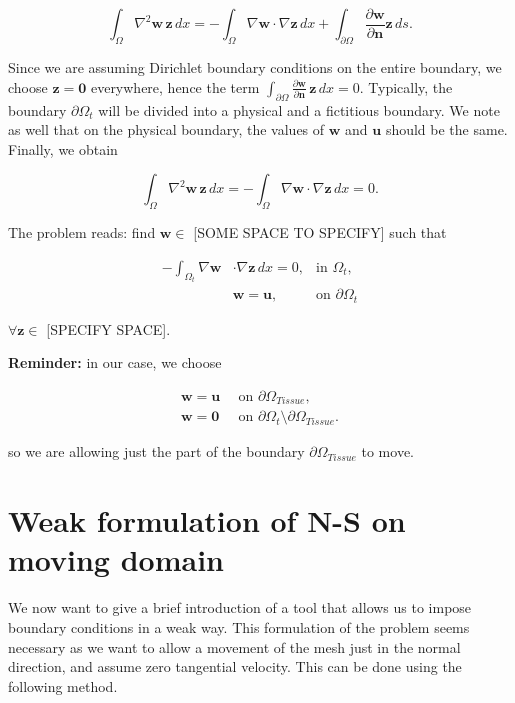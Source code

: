 \documentclass[11pt,a4paper,titlepage]{report}
\begin{document}
\[
\int_{\Omega} \nabla^2 \mathbf{w} \, \mathbf{z} \, dx = - \int_{\Omega} \nabla \mathbf{w} \cdot \nabla \mathbf{z} \, dx + \int_{\partial \Omega} \frac{\partial \mathbf{w}}{\partial \mathbf{n}} \mathbf{z} \, ds.
\]

Since we are assuming Dirichlet boundary conditions on the entire boundary, we choose $\mathbf{z = 0}$ everywhere, hence the term $\int_{\partial \Omega} \frac{\partial \mathbf{w}}{\partial \mathbf{n}} \, \mathbf{z} \, dx  = 0 $. Typically, the boundary $\partial \Omega_t$ will be divided into a physical and a fictitious boundary. We note as well that on the physical boundary, the values of $\mathbf{w}$ and $\mathbf{u}$ should be the same.
Finally, we obtain

\[
\int_{\Omega} \nabla^2 \mathbf{w} \, \mathbf{z} \, dx = - \int_{\Omega} \nabla \mathbf{w} \cdot \nabla \mathbf{z} \, dx = 0.
\]

The problem reads: find $\mathbf{w} \in$ [SOME SPACE TO SPECIFY] such that

\[
\begin{aligned}
-  \int_{\Omega_t} \nabla \mathbf{w} & \cdot \nabla \mathbf{z} \, dx = 0, & \text{in } \Omega_t, \\
& \mathbf{w} = \mathbf{u}, & \text{on } \partial \Omega_t
\end{aligned}
\]

$\forall \mathbf{z} \in $ [SPECIFY SPACE].

\textbf{Reminder:} in our case, we choose

\[
\begin{aligned}
\mathbf{w = u} \, & \text{ on } \partial \Omega_{Tissue}, \\
\mathbf{w = 0} \, & \text{ on } \partial \Omega_t \setminus \partial \Omega_{Tissue}.
\end{aligned}
\]

so we are allowing just the part of the boundary $\partial \Omega_{Tissue}$ to move.

\section{Weak formulation of N-S on moving domain}
We now want to give a brief introduction of a tool that allows us to impose boundary conditions in a weak way. This formulation of the problem seems necessary as we want to allow a movement of the mesh just in the normal direction, and assume zero tangential velocity. This can be done using the following method.
\end{document}

